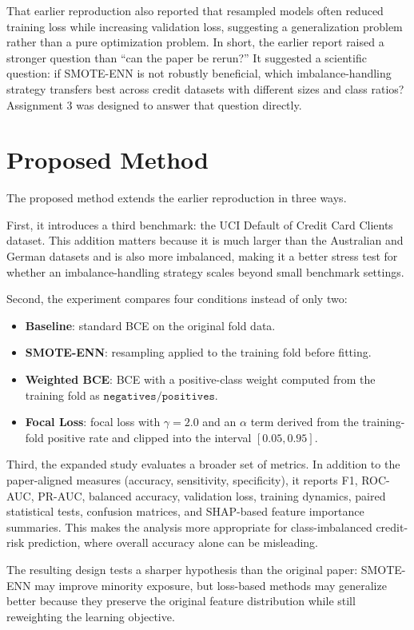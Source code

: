 \documentclass[11pt,a4paper]{article}
\begin{document}
That earlier reproduction also reported that resampled models often reduced training loss while increasing validation loss, suggesting a generalization problem rather than a pure optimization problem. In short, the earlier report raised a stronger question than ``can the paper be rerun?'' It suggested a scientific question: if SMOTE-ENN is not robustly beneficial, which imbalance-handling strategy transfers best across credit datasets with different sizes and class ratios? Assignment 3 was designed to answer that question directly.

\section{Proposed Method}
The proposed method extends the earlier reproduction in three ways.

First, it introduces a third benchmark: the UCI Default of Credit Card Clients dataset. This addition matters because it is much larger than the Australian and German datasets and is also more imbalanced, making it a better stress test for whether an imbalance-handling strategy scales beyond small benchmark settings.

Second, the experiment compares four conditions instead of only two:
\begin{itemize}
    \item \textbf{Baseline}: standard BCE on the original fold data.
    \item \textbf{SMOTE-ENN}: resampling applied to the training fold before fitting.
    \item \textbf{Weighted BCE}: BCE with a positive-class weight computed from the training fold as $\texttt{negatives} / \texttt{positives}$.
    \item \textbf{Focal Loss}: focal loss with $\gamma = 2.0$ and an $\alpha$ term derived from the training-fold positive rate and clipped into the interval $[0.05, 0.95]$.
\end{itemize}

Third, the expanded study evaluates a broader set of metrics. In addition to the paper-aligned measures (accuracy, sensitivity, specificity), it reports F1, ROC-AUC, PR-AUC, balanced accuracy, validation loss, training dynamics, paired statistical tests, confusion matrices, and SHAP-based feature importance summaries. This makes the analysis more appropriate for class-imbalanced credit-risk prediction, where overall accuracy alone can be misleading.

The resulting design tests a sharper hypothesis than the original paper: SMOTE-ENN may improve minority exposure, but loss-based methods may generalize better because they preserve the original feature distribution while still reweighting the learning objective.
\end{document}
